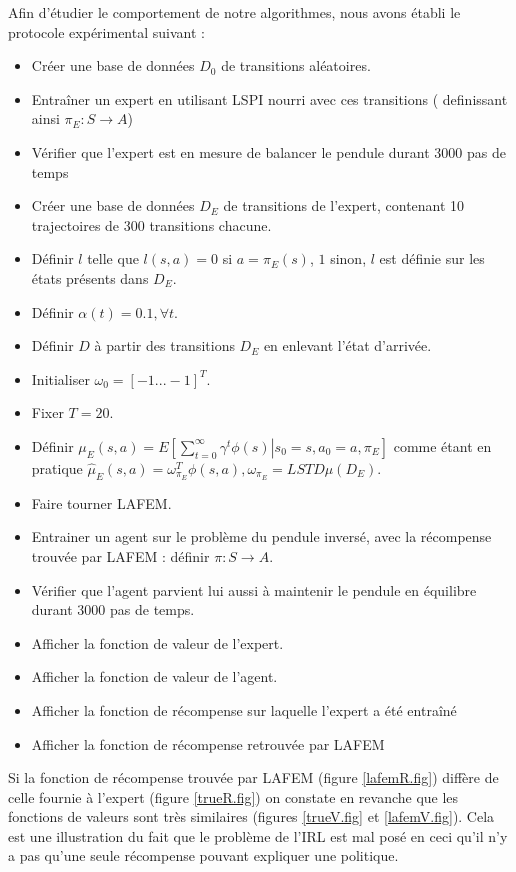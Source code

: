 \documentclass[publibook-draft]{CAp2012}
\begin{document}
Afin d'étudier le comportement de notre algorithmes, nous avons établi le protocole expérimental suivant :
\begin{itemize}
 \item Créer une base de données $D_0$ de transitions aléatoires.
 \item Entraîner un expert en utilisant LSPI nourri avec ces transitions ( definissant ainsi $\pi_E : S\rightarrow A$)
 \item Vérifier que l'expert est en mesure de balancer le pendule durant 3000 pas de temps
 \item Créer une base de données $D_E$ de transitions de l'expert, contenant 10 trajectoires de 300 transitions chacune.
 \item Définir $l$ telle que $l(s,a) = 0$ si $a=\pi_E(s)$, $1$ sinon, $l$ est définie sur les états présents dans $D_E$.
 \item Définir $\alpha(t) = 0.1,\forall t$.
 \item Définir $D$ à partir des transitions $D_E$ en enlevant l'état d'arrivée.
 \item Initialiser $\omega_0 = [-1...-1]^T$.
 \item Fixer $T=20$.
 \item Définir $\mu_E(s,a) = E\left.\left[\sum\limits_{t=0}^\infty \gamma^t \phi(s)\right|s_0 = s, a_0 = a, \pi_E\right]$ comme étant en pratique $\hat\mu_E(s,a) =  \omega^T_{\pi_E}\phi(s,a), \omega_{\pi_E} = LSTD\mu(D_E)$.
 \item Faire tourner LAFEM.
 \item Entrainer un agent sur le problème du pendule inversé, avec la récompense trouvée par LAFEM : définir $\pi : S\rightarrow A$.
 \item Vérifier que l'agent parvient lui aussi à maintenir le pendule en équilibre durant 3000 pas de temps.
 \item Afficher la fonction de valeur de l'expert.
 \item Afficher la fonction de valeur de l'agent.
 \item Afficher la fonction de récompense sur laquelle l'expert a été entraîné
 \item Afficher la fonction de récompense retrouvée par LAFEM
\end{itemize}

Si la fonction de récompense trouvée par LAFEM (figure \ref{lafemR.fig}) diffère de celle fournie à l'expert (figure \ref{trueR.fig}) on constate en revanche que les fonctions de valeurs sont très similaires (figures \ref{trueV.fig} et \ref{lafemV.fig}). Cela est une illustration du fait que le problème de l'IRL est mal posé en ceci qu'il n'y a pas qu'une seule récompense pouvant expliquer une politique.\\
\end{document}

